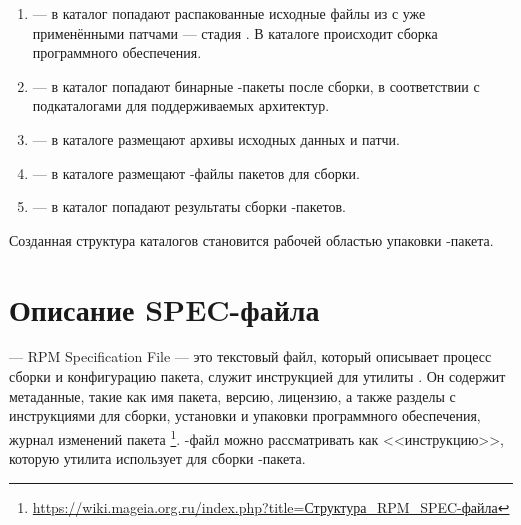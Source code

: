 \begin{enumerate}
	\item {} --- в каталог попадают распакованные исходные файлы из
		 с уже применёнными патчами --- стадия .
		В каталоге  происходит сборка программного обеспечения.
	\item {} --- в каталог  попадают бинарные -пакеты после
		сборки, в соответствии с подкаталогами для поддерживаемых архитектур.
	\item {} --- в каталоге размещают архивы исходных данных и патчи.
	\item {} --- в каталоге размещают -файлы пакетов для сборки.
	\item {} --- в каталог  попадают результаты сборки -пакетов.
\end{enumerate}

Созданная структура каталогов становится рабочей областью упаковки -пакета.



\section{Описание SPEC-файла}
 --- RPM Specification File --- это текстовый файл, который описывает процесс сборки и конфигурацию
пакета, служит инструкцией для утилиты . Он содержит метаданные, такие как имя пакета, версию,
лицензию, а также разделы с инструкциями для сборки, установки и упаковки программного обеспечения, журнал
изменений пакета%
\footnote{\href{https://wiki.mageia.org.ru/index.php?title=\%D0\%A1\%D1\%82\%D1\%80\%D1\%83\%D0\%BA\%D1\%82\%D1\%83\%D1\%80\%D0\%B0_RPM_SPEC-\%D1\%84\%D0\%B0\%D0\%B9\%D0\%BB\%D0\%B0}%
{https://wiki.mageia.org.ru/index.php?title=Структура\_RPM\_SPEC-файла}}. %
-файл можно рассматривать как <<инструкцию>>, которую утилита  использует для сборки -пакета.

